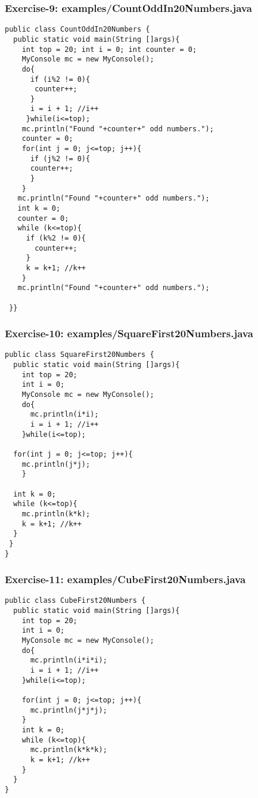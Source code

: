\documentclass[xcolor=dvipsnames,dvip,notes=show,handout,table]{beamer}
\begin{document}
\begin{frame}[fragile]
\frametitle{Exercise-9: examples/CountOddIn20Numbers.java}
\tiny
\begin{lstlisting}
public class CountOddIn20Numbers {
  public static void main(String []args){
    int top = 20; int i = 0; int counter = 0;
    MyConsole mc = new MyConsole();
    do{
      if (i%2 != 0){
       counter++;
      }
      i = i + 1; //i++
     }while(i<=top);				
    mc.println("Found "+counter+" odd numbers.");
    counter = 0;
    for(int j = 0; j<=top; j++){
      if (j%2 != 0){
      counter++;
      }
    }
   mc.println("Found "+counter+" odd numbers.");
   int k = 0;
   counter = 0;
   while (k<=top){
     if (k%2 != 0){
       counter++;
     }
     k = k+1; //k++
    }
   mc.println("Found "+counter+" odd numbers.");

 }}
\end{lstlisting}
\end{frame}






\begin{frame}[fragile]
\frametitle{Exercise-10: examples/SquareFirst20Numbers.java}
\tiny
\begin{lstlisting}
public class SquareFirst20Numbers {
  public static void main(String []args){
    int top = 20;
    int i = 0;
    MyConsole mc = new MyConsole();
    do{
      mc.println(i*i);
      i = i + 1; //i++
    }while(i<=top);
  
  for(int j = 0; j<=top; j++){
    mc.println(j*j);
    }

  int k = 0;
  while (k<=top){
    mc.println(k*k);
    k = k+1; //k++
  }
 }
}
\end{lstlisting}
\end{frame}




\begin{frame}[fragile]
\frametitle{Exercise-11: examples/CubeFirst20Numbers.java}
\tiny
\begin{lstlisting}
public class CubeFirst20Numbers {
  public static void main(String []args){
    int top = 20;
    int i = 0;
    MyConsole mc = new MyConsole();
    do{
      mc.println(i*i*i);
      i = i + 1; //i++
    }while(i<=top);

    for(int j = 0; j<=top; j++){
      mc.println(j*j*j);
    }
    int k = 0;
    while (k<=top){
      mc.println(k*k*k);
      k = k+1; //k++
    }
  }
}
\end{lstlisting}
\end{frame}
\end{document}
